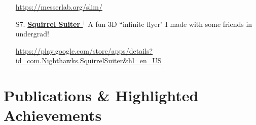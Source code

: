 \documentclass[letterpaper,11pt]{article}
\let\oldhref\href
\renewcommand{\href}[2]{\oldhref{#1}{\bfseries#2}}
\begin{document}
\begin{enumerate}
        \space \url{https://messerlab.org/slim/}

\item [S7.] \href{https://play.google.com/store/apps/details?id=com.Nighthawks.SquirrelSuiter&hl=en_US}{Squirrel Suiter $^{\dagger}$} 
        \space \space A fun 3D ``infinite flyer" I made with some friends in undergrad! 
        
        \space \url{https://play.google.com/store/apps/details?id=com.Nighthawks.SquirrelSuiter&hl=en_US}


\end{enumerate}

\section{Publications \& Highlighted Achievements}
%
\end{document}
